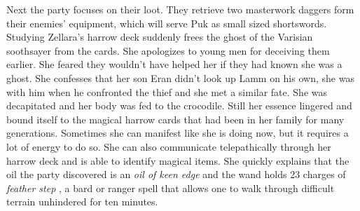 Next the party focuses on their loot. They retrieve two masterwork daggers form their enemies' equipment, which will serve Puk as small sized shortswords. Studying Zellara's harrow deck suddenly frees the ghost of the Varisian soothsayer from the cards. She apologizes to young men for deceiving them earlier. She feared they wouldn't have helped her if they had known she was a ghost. She confesses that her son Eran didn't look up Lamm on his own, she was with him when he confronted the thief and she met a similar fate. She was decapitated and her body was fed to the crocodile. Still her essence lingered and bound itself to the magical harrow cards that had been in her family for many generations. Sometimes she can manifest like she is doing now, but it requires a lot of energy to do so. She can also communicate telepathically through her harrow deck and is able to identify magical items. She quickly explains that the oil the party discovered is an {\itshape oil of keen edge} and the wand holds 23 charges of  {\itshape feather step} , a bard or ranger spell that allows one to walk through difficult terrain unhindered for ten minutes. 